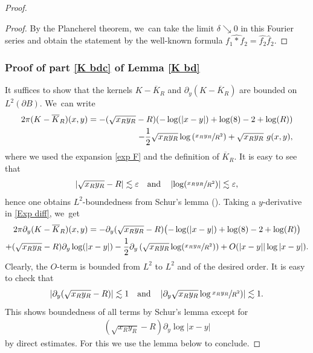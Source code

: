 \documentclass[10pt]{amsart}
\let\epsilon\varepsilon
\theoremstyle{definition}
\newcommand\eq{=}
\let\de\partial
\let\eps\epsilon
\begin{document}
\begin{proof}
\begin{proof}
By the Plancherel theorem, we~can take the limit $\delta\searrow 0$ in this Fourier series and obtain the statement by the well-known formula $\widehat{f_1*f_2}=\widehat{f_2}\widehat{f}_2$.
\end{proof}

\subsubsection*{Proof of part \eqref{K bdc} of Lemma \ref{K bd}}
It suffices to show that the kernels $K-\overline{K}_R$ and $\de_y(K-\overline{K}_R)$ are bounded on $L^2(\de B)$. We~can write
\begin{equation}\begin{aligned}\label{Exp diff}
2\pi(K-\overline{K}_R)(x,y)\eq -(\sqrt{x_Ry_R}-R)(-\log(|x-y|)+\log(8)-2+\log(R)) \\
-\frac{1}{2}\sqrt{x_Ry_R}\log\left(\sfrac{x_Ry_R}{R^2}\right)+\sqrt{x_Ry_R}\,\,g(x,y),
\end{aligned}\end{equation}
where we used the expansion \eqref{exp F} and the definition of $\overline{K}_R$. It is easy to see that
\begin{align*}
\left|\sqrt{x_Ry_R}-R\right|\lesssim \eps\quad\text{and}\quad \left|\log(\sfrac{x_Ry_R}{R^2})\right|\lesssim \eps,
\end{align*}
hence one obtains $L^2$-boundedness from Schur's lemma (\cf \cite[App.\,A.1]{Grafakos}).
Taking a $y$-derivative in \eqref{Exp diff}, we~get
\begin{multline*}
2\pi\de_y (K-\overline{K}_R)(x,y)\eq-\de_y (\sqrt{x_Ry_R}-R) \bigl(-\log(|x-y|)+\log(8)-2+\log(R)\bigr)\\
+(\sqrt{x_Ry_R}-R)\de_y\log(|x-y|)-\frac{1}{2}\de_y\left(\sqrt{x_Ry_R}\log(\sfrac{x_Ry_R}{R^2})\right)+O(|x-y||\log|x-y|).
\end{multline*}
Clearly, the $O$-term is bounded from $L^2$ to $L^2$ and of the desired order. It is easy to check that
\begin{align*}
\left|\de_y (\sqrt{x_Ry_R}-R)\right|\lesssim 1\quad\text{and}\quad\left|\de_y\sqrt{x_Ry_R}\log\sfrac{x_Ry_R}{R^2})\right|\lesssim 1.
\end{align*}
This shows boundedness of all terms by Schur's lemma except for
\begin{align*}(\sqrt{x_Ry_R}-R)\de_y\log|x-y|
\end{align*}
by direct estimates. For this we use the lemma below to conclude.
\end{proof}
\end{document}
